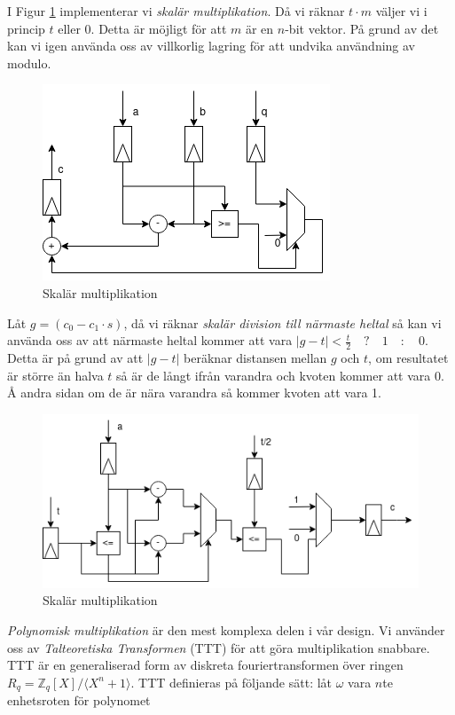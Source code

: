 \documentclass{paper}
\newcommand{\bZ}{\mathbb{Z}}
\begin{document}
I Figur \ref{fig:scal_mul} implementerar vi \textit{skalär multiplikation}. Då
vi räknar $t\cdot m$ väljer vi i princip $t$ eller $0$. Detta är möjligt för att
$m$ är en $n$-bit vektor. På grund av det kan vi igen använda oss av
villkorlig lagring för att undvika användning av modulo.

\begin{figure}[H]
    \centering
    \includegraphics[scale=0.5]{images/scalar_multiplication.png}
    \caption{Skalär multiplikation}
    \label{fig:scal_mul}
\end{figure}

Låt $g = (c_0 - c_1 \cdot s)$, då vi räknar
\textit{skalär division till närmaste heltal} så kan vi använda oss av att
närmaste heltal kommer att vara $|g - t| < \frac{t}{2} \quad ? \quad 1 \quad :
\quad 0$. Detta är på grund av att $|g - t|$ beräknar distansen mellan $g$ och
$t$, om resultatet är större än halva $t$ så är de långt ifrån varandra och
kvoten kommer att vara 0. Å andra sidan om de är nära varandra så kommer
kvoten att vara 1.

\begin{figure}[H]
    \centering
    \includegraphics[scale=0.5]{images/scalar_division.png}
    \caption{Skalär multiplikation}
    \label{fig:scal_div}
\end{figure}

\textit{Polynomisk multiplikation} är den mest komplexa delen i vår design.
Vi använder oss av \textit{Talteoretiska Transformen} (TTT) för att göra
multiplikation snabbare. TTT är en generaliserad form av diskreta
fouriertransformen över ringen $R_q = \bZ_q[X] / \langle X^n + 1 \rangle$. TTT
definieras på följande sätt: låt $\omega$ vara $n$te enhetsroten för polynomet
\end{document}

